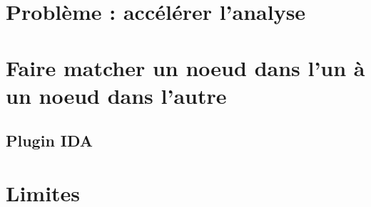 \section{Problème : accélérer l'analyse}

\section{Faire matcher un noeud dans l'un à un noeud dans l'autre}

\subsection{Plugin IDA}

\section{Limites}
